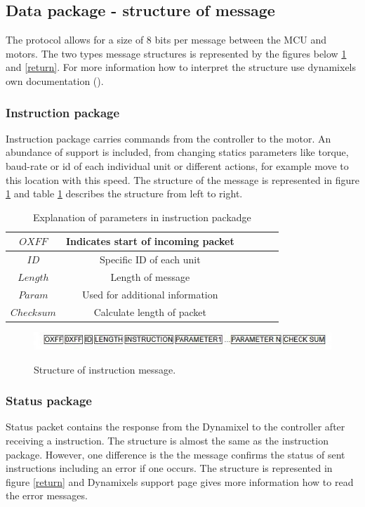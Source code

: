 \subsection{Data package - structure of message}
The protocol allows for a size of 8 bits per message between the MCU and motors. 
The two types message structures is represented by the figures below \ref{instr} and \ref{return}.
For more information how to interpret the structure use dynamixels own documentation ().

\subsubsection{Instruction package}
Instruction package carries commands from the controller to the motor.
An abundance of support is included,
from changing statics parameters like torque, baud-rate or id of each individual unit or different actions,
for example move to this location with this speed.
The structure of the message is represented in figure \ref{instr} and table \ref{instr_table} describes the structure from left to right. 

\begin{table}[H]
    \centering
    \caption{Explanation of parameters in instruction packadge}
    \begin{tabular}{c | c c c c c}
        \(OXFF\) & Indicates start of incoming packet  \\
        \hline
        \(ID\) & Specific ID of each unit  \\
        \hline
        \(Length\) & Length of message \\
        \hline
        \(Param\) & Used for additional information  \\
        \hline
        \(Check sum\) & Calculate length of packet \\
        \hline
    \end{tabular}
    \label{instr_table}
\end{table}

\begin{figure}[H]
    \centering
    \includegraphics[width=\columnwidth]{chapters/img/instruction_packadge.JPG}
    \label{instr}
    \caption{Structure of instruction message.}
\end{figure}

\subsubsection{Status package}
Status packet contains the response from the Dynamixel to the controller after receiving a instruction.
The structure is almost the same as the instruction package.
However, one difference is the the message confirms the status of sent instructions including an error if one occurs.
The structure is represented in figure \ref{return} and Dynamixels support page \cite{protocol1} gives more information how to read the error messages.

